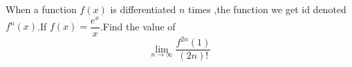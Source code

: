 When a function $f(x)$ is differentiated $n$ times ,the function we get id denoted $f^n(x)$.If $f(x)=\dfrac {e^x}{x}$.Find the value of
\[\lim_{n \to \infty} \dfrac {f^ {2n}(1)}{(2n)!}\]
